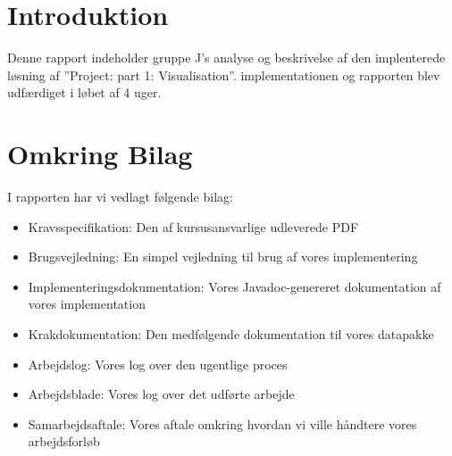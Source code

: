 \section{Introduktion}
Denne rapport indeholder gruppe J's analyse og beskrivelse af den implenterede løsning af ''Project: part 1: Visualisation''. implementationen og rapporten blev udfærdiget i løbet af 4 uger.
\section{Omkring Bilag}
I rapporten har vi vedlagt følgende bilag:
\begin{itemize}
\item{Kravsspecifikation: Den af kursusansvarlige udleverede PDF}
\item{Brugsvejledning: En simpel vejledning til brug af vores implementering}
\item{Implementeringsdokumentation: Vores Javadoc-genereret dokumentation af vores implementation}
\item{Krakdokumentation: Den medfølgende dokumentation til vores datapakke}
\item{Arbejdslog: Vores log over den ugentlige proces}
\item{Arbejdsblade: Vores log over det udførte arbejde}
\item{Samarbejdsaftale: Vores aftale omkring hvordan vi ville håndtere vores arbejdsforløb} 
\end{itemize}

